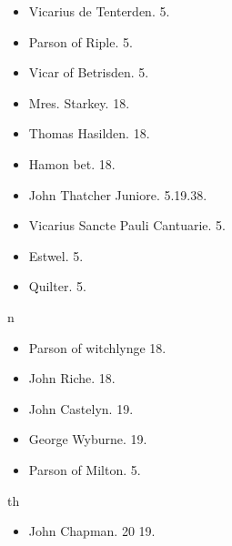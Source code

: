 \documentclass[12pt, a4paper]{book}
\begin{document}
				\begin{itemize}
					\item[]Vicarius de Tenterden. 5.
					\item[]Parson of Riple. 5.
					\item[]Vicar of Betrisden. 5.
				\end{itemize}
            			\begin{itemize}
            				\item[]Mres. Starkey. 18.
            				\item[]Thomas Hasilden. 18.
            				\item[]Hamon bet. 18.
            			\end{itemize}
            		
            		
            			
				\marginpar[\vspace{0.5cm}{\textcolor{Gray}{n}}]{}
			
            			
				\marginpar[\vspace{0.5cm}{\textcolor{Gray}{n}}]{}
			
            			
				\marginpar[\vspace{0.5cm}{\textcolor{Gray}{th n}}]{}
			
            			
				\marginpar[\vspace{0.5cm}{\textcolor{Gray}{n}}]{}
			
            			\begin{itemize}
            				\item[]John Thatcher Juniore. 5.19.38.
					\item[]Vicarius Sancte Pauli Cantuarie. 5.
					\item[]Estwel. 5.
					\item[]Quilter. 5.
					
				\end{itemize}
            			n
            			\begin{itemize}
            				\item[]Parson of witchlynge 18.
            				\item[]John Riche. 18.
            				\item[]John Castelyn. 19.
            				\item[]George Wyburne. 19.
            			\end{itemize}
			
            		
            			\begin{itemize}
            				\item[]Parson of Milton. 5.
            			\end{itemize}
            			th
            			\begin{itemize}
            				\item[]John Chapman. 20 19.
            			\end{itemize}
            		
\end{document}
